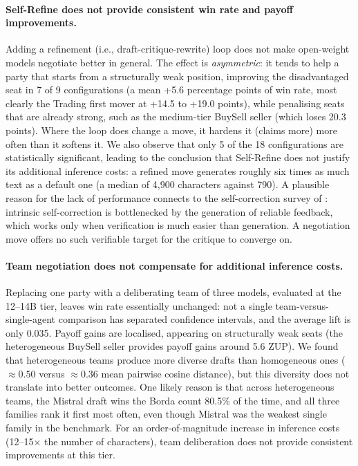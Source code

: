 \paragraph{Self-Refine does not provide consistent win rate and payoff improvements.} Adding a refinement (i.e., draft-critique-rewrite) loop does not make open-weight models negotiate better in general. The effect is \textit{asymmetric}: it tends to help a party that starts from a structurally weak position, improving the disadvantaged seat in 7 of 9 configurations (a mean +5.6 percentage points of win rate, most clearly the Trading first mover at +14.5 to +19.0 points), while penalising seats that are already strong, such as the medium-tier BuySell seller (which loses 20.3 points). Where the loop does change a move, it hardens it (claims more) more often than it softens it. We also observe that only 5 of the 18 configurations are statistically significant, leading to the conclusion that Self-Refine does not justify its additional inference costs: a refined move generates roughly six times as much text as a default one (a median of 4,900 characters against 790). A plausible reason for the lack of performance connects to the self-correction survey of \textcite{kamoi-etal-2024-llms}: intrinsic self-correction is bottlenecked by the generation of reliable feedback, which works only when verification is much easier than generation. A negotiation move offers no such verifiable target for the critique to converge on.

\paragraph{Team negotiation does not compensate for additional inference costs.} Replacing one party with a deliberating team of three models, evaluated at the 12--14B tier, leaves win rate essentially unchanged: not a single team-versus-single-agent comparison has separated confidence intervals, and the average lift is only 0.035. Payoff gains are localised, appearing on structurally weak seats (the heterogeneous BuySell seller provides payoff gains around 5.6 ZUP). We found that heterogeneous teams produce more diverse drafts than homogeneous ones ($\approx 0.50$ versus $\approx 0.36$ mean pairwise cosine distance), but this diversity does not translate into better outcomes. One likely reason is that across heterogeneous teams, the Mistral draft wins the Borda count 80.5\% of the time, and all three families rank it first most often, even though Mistral was the weakest single family in the benchmark. For an order-of-magnitude increase in inference costs (12--15$\times$ the number of characters), team deliberation does not provide consistent improvements at this tier.


